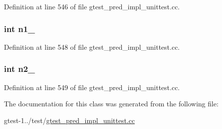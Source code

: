 \-Definition at line 546 of file gtest\-\_\-pred\-\_\-impl\-\_\-unittest.\-cc.

\hypertarget{classPredicate2Test_a7a61c539c18d10f12696fc25b115d699}{
\subsubsection[{n1\-\_\-}]{\setlength{\rightskip}{0pt plus 5cm}int {\bf n1\-\_\-}}}\label{dc/dc4/classPredicate2Test_a7a61c539c18d10f12696fc25b115d699}


\-Definition at line 548 of file gtest\-\_\-pred\-\_\-impl\-\_\-unittest.\-cc.

\hypertarget{classPredicate2Test_a7dc886196252de63d1ca064997069377}{
\subsubsection[{n2\-\_\-}]{\setlength{\rightskip}{0pt plus 5cm}int {\bf n2\-\_\-}}}\label{dc/dc4/classPredicate2Test_a7dc886196252de63d1ca064997069377}


\-Definition at line 549 of file gtest\-\_\-pred\-\_\-impl\-\_\-unittest.\-cc.



\-The documentation for this class was generated from the following file\-:\begin{DoxyCompactItemize}
\item 
gtest-\/1../test/\hyperlink{gtest__pred__impl__unittest_8cc}{gtest\-\_\-pred\-\_\-impl\-\_\-unittest.\-cc}\end{DoxyCompactItemize}
